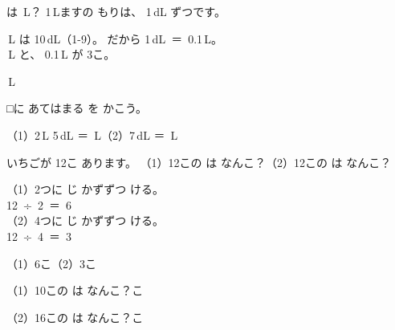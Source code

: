 \begin{reidai}
\noindent\begin{minipage}[c]{0.66\linewidth}
は \,L？ 1\,Lますの もりは、 1\,dL ずつです。

\,L は 10\,dL（1-9）。 だから \mbox{1\,dL ＝ 0.1\,L}。\\
\,L と、 0.1\,L が 3こ。

\,L
\end{minipage}\hfill
\begin{minipage}[c]{0.32\linewidth}\centering
{}
\end{minipage}
\end{reidai}

\begin{jibun}
□に あてはまる を かこう。\par\vspace{2pt}
\noindent\hspace*{1\zw}（1）2\,L 5\,dL ＝ \bkkakikomi\,L\hspace{3\zw}（2）7\,dL ＝ \bkkakikomi\,L
\end{jibun}

\begin{reidai}
いちごが 12こ あります。 （1）12この  は なんこ？\hspace{1\zw}（2）12この  は なんこ？

\kangaekata （1）2つに じ かずずつ ける。\\
\bkqokindent\hspace*{2\zw}\mbox{12 ÷ 2 ＝ 6}\\
\bkqokindent（2）4つに じ かずずつ ける。\\
\bkqokindent\hspace*{2\zw}\mbox{12 ÷ 4 ＝ 3}

\kotae （1）6こ\hspace{2\zw}（2）3こ
\end{reidai}

\begin{jibun}
（1）10この  は なんこ？\hfill\bkkakikomi\enspace こ\par\vspace{2pt}
（2）16この  は なんこ？\hfill\bkkakikomi\enspace こ
\end{jibun}

